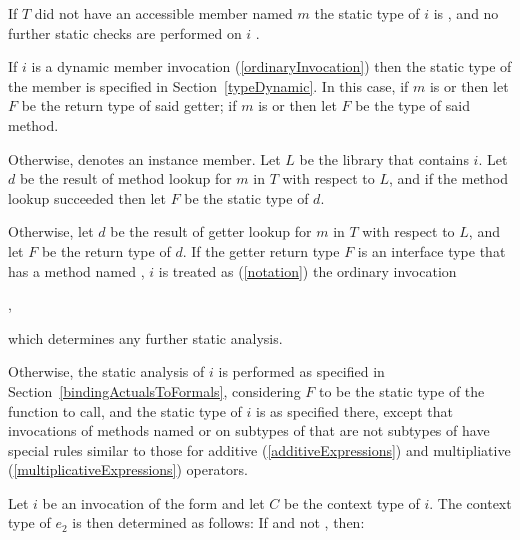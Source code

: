 \documentclass[makeidx]{article}
\begin{document}
{\LMHash{}%
If $T$ did not have an accessible member named $m$
the static type of $i$ is \DYNAMIC,
and no further static checks are performed on $i$
.

\LMHash{}%
If $i$ is a dynamic  member invocation
(\ref{ordinaryInvocation})
then the static type of the member is specified in
Section~\ref{typeDynamic}.
In this case, if $m$ is  or 
then let $F$ be the return type of said getter;
if $m$ is  or 
then let $F$ be the type of said method.


\LMHash{}%
Otherwise,  denotes an instance member.
Let $L$ be the library that contains $i$.
Let $d$ be the result of method lookup for $m$ in $T$ with respect to $L$,
and if the method lookup succeeded then let $F$ be the static type of $d$.

\LMHash{}%
Otherwise, let $d$ be the result of getter lookup
for $m$ in $T$ with respect to $L$,
and let $F$ be the return type of $d$.
If the getter return type $F$ is an interface type
that has a method named \CALL,
$i$ is treated as
(\ref{notation})
the ordinary invocation

\noindent
{},

\noindent
which determines any further static analysis.

\LMHash{}%
Otherwise, the static analysis of $i$ is performed
as specified in Section~\ref{bindingActualsToFormals},
considering $F$ to be the static type of the function to call,
and the static type of $i$ is as specified there,
except that invocations of methods named 
or  on subtypes of  that are not subtypes of 
have special rules similar to those for additive (\ref{additiveExpressions})
and multipliative (\ref{multiplicativeExpressions}) operators.

\LMHash{}%
Let $i$ be an invocation of the form 
and let $C$ be the context type of $i$.
The context type of $e_2$ is then determined as follows:
If  and not , then:

}
\end{document}

